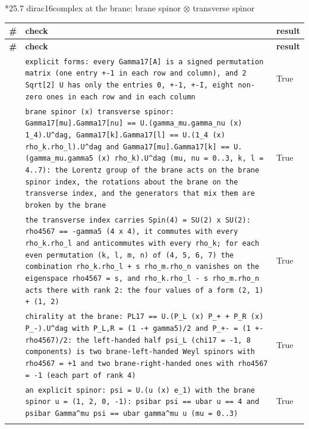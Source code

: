 \documentclass[10pt,a4paper]{article}
\makeatletter
\renewcommand\subsubsection{\@startsection{subsubsection}{3}{\z@}{-3.25ex\@plus -1ex \@minus -.2ex}{1.5ex \@plus .2ex}{\normalfont\normalsize\bfseries\raggedright}}
\makeatother
\begin{document}
\subsubsection*{25.7 dirac16complex at the brane: brane spinor \texorpdfstring{\ensuremath{\otimes}}{⊗} transverse spinor}
{\footnotesize
\begin{longtable}{>{\raggedright\arraybackslash}p{}>{\raggedright\arraybackslash}p{}>{\raggedright\arraybackslash}p{}}
\toprule
\textbf{\#} & \textbf{check} & \textbf{result} \\
\midrule\endfirsthead
\toprule
\textbf{\#} & \textbf{check} & \textbf{result} \\
\midrule\endhead
\endfoot
\bottomrule\endlastfoot
439 & \texttt{explicit forms: every Gamma17[A] is a signed permutation matrix (one entry +-1 in each row and column), and 2 Sqrt[2] U has only the entries 0, +-1, +-I, eight non-zero ones in each row and in each column} & True \\
440 & \texttt{brane spinor (x) transverse spinor: Gamma17[mu].Gamma17[nu] == U.(gamma\_\allowbreak{}mu.gamma\_\allowbreak{}nu (x) 1\_\allowbreak{}4).U\textasciicircum{}dag, Gamma17[k].Gamma17[l] == U.(1\_\allowbreak{}4 (x) rho\_\allowbreak{}k.rho\_\allowbreak{}l).U\textasciicircum{}dag and Gamma17[mu].Gamma17[k] == U.(gamma\_\allowbreak{}mu.gamma5 (x) rho\_\allowbreak{}k).U\textasciicircum{}dag (mu, nu = 0..3, k, l = 4..7): the Lorentz group of the brane acts on the brane spinor index, the rotations about the brane on the transverse index, and the generators that mix them are broken by the brane} & True \\
441 & \texttt{the transverse index carries Spin(4) = SU(2) x SU(2): rho4567 == -gamma5 (4 x 4), it commutes with every rho\_\allowbreak{}k.rho\_\allowbreak{}l and anticommutes with every rho\_\allowbreak{}k; for each even permutation (k, l, m, n) of (4, 5, 6, 7) the combination rho\_\allowbreak{}k.rho\_\allowbreak{}l + s rho\_\allowbreak{}m.rho\_\allowbreak{}n vanishes on the eigenspace rho4567 = s, and rho\_\allowbreak{}k.rho\_\allowbreak{}l - s rho\_\allowbreak{}m.rho\_\allowbreak{}n acts there with rank 2: the four values of a form (2, 1) + (1, 2)} & True \\
442 & \texttt{chirality at the brane: PL17 == U.(P\_\allowbreak{}L (x) P\_\allowbreak{}+ + P\_\allowbreak{}R (x) P\_\allowbreak{}-).U\textasciicircum{}dag with P\_\allowbreak{}L,R = (1 -+ gamma5)/\allowbreak{}2 and P\_\allowbreak{}+- = (1 +- rho4567)/\allowbreak{}2: the left-handed half psi\_\allowbreak{}L (chi17 = -1, 8 components) is two brane-left-handed Weyl spinors with rho4567 = +1 and two brane-right-handed ones with rho4567 = -1 (each part of rank 4)} & True \\
443 & \texttt{an explicit spinor: psi = U.(u (x) e\_\allowbreak{}1) with the brane spinor u = (1, 2, 0, -1): psibar psi == ubar u == 4 and psibar Gamma\textasciicircum{}mu psi == ubar gamma\textasciicircum{}mu u (mu = 0..3)} & True \\*
\end{longtable}}
\end{document}
